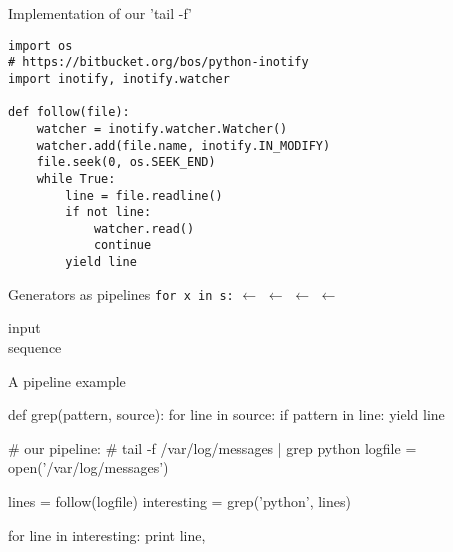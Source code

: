 \documentclass{beamer}
\newcommand{\lla}{\ensuremath{\longleftarrow}}
\begin{document}
\begin{frame}[fragile]{Implementation of our 'tail -f'}
\begin{verbatim}
import os
# https://bitbucket.org/bos/python-inotify
import inotify, inotify.watcher

def follow(file):
    watcher = inotify.watcher.Watcher()
    watcher.add(file.name, inotify.IN_MODIFY)
    file.seek(0, os.SEEK_END)
    while True:
        line = file.readline()
        if not line:
            watcher.read()
            continue
        yield line
\end{verbatim}
\end{frame}

\begin{frame}{Generators as pipelines}
  \mbox{\alert<6>{\texttt{for x in s:}}}%
  \lla {}%
  \lla {}%
  \lla {}%
  \lla \parbox{4.5em}{\alert<2>{input\\sequence}}
\end{frame}

\begin{frame}[fragile]{A pipeline example}
  \begin{pycode}
    def grep(pattern, source):
        for line in source:
            if pattern in line:
                 yield line
  \end{pycode}
  \pause

  \begin{pycode}
    # our pipeline:
    #     tail -f /var/log/messages | grep python
    logfile = open('/var/log/messages')

    lines = follow(logfile)
    interesting = grep('python', lines)

    for line in interesting:
        print line,
  \end{pycode}
\end{frame}

\end{document}
